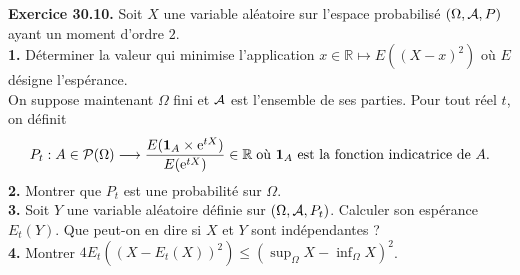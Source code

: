 \documentclass[a4paper,12pt,francais]{article}
\newcommand{\field}[1]{\mathbb{#1}}
\newcommand{\R}{\field{R}}
\newcommand{\e}{\mbox{e}}
\begin{document}
\noindent
{\bf Exercice 30.10.} %
Soit $X$ une variable aléatoire sur l'espace probabilisé $(\Omega,{\cal{A}},P)$ ayant un moment d'ordre $2$.\\
{\bf 1.} Déterminer la valeur qui minimise l'application $x \in \R \mapsto E((X - x)^2 )$ où $E$ désigne l'espérance.\\
On suppose maintenant $\Omega$ fini et ${\cal{A}}$ est l'ensemble de ses parties. Pour tout réel $t$, on définit
$$P_t : A \in {\cal{P}}(\Omega) \longrightarrow  \frac{E(\mathbf{1}_A \times \e^{tX})}{E(\e^{tX})} \in \R  \; \mbox{où $\mathbf{1}_A$ est la fonction indicatrice de }A.$$
{\bf 2.} Montrer que $P_t$ est une probabilité sur $\Omega$.\\
{\bf 3.} Soit $Y$ une variable aléatoire définie sur $(\Omega,{\cal{A}},P_t)$. Calculer son espérance $E_t (Y)$. Que peut-on en dire si $X$ et $Y$ sont indépendantes ?\\
{\bf 4.} Montrer $\displaystyle
4 E_t( (X-E_t(X))^2 ) \leqslant \left( \sup_\Omega X - \inf_\Omega X \right)^2$.\\
\end{document}
